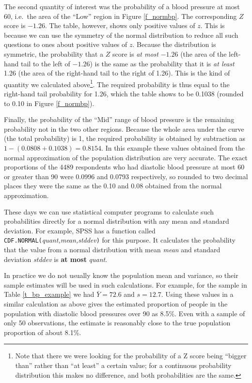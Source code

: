 The second quantity of interest was the probability of a blood pressure
at most 60, i.e.\ the area of the ``Low'' region in Figure
\ref{f_normbp}. The corresponding $Z$ score is $-1.26$. The table,
however, shows only positive values of $z$. This is because we
can use the symmetry of the normal distribution to reduce all such
questions to ones about positive values of $z$. Because the
distribution is symmetric, the probability that a $Z$ score is \emph{at
most} $-1.26$ (the area of the left-hand tail to the left of $-1.26$)
is the same as the probability that it is \emph{at least} 1.26 (the area
of the right-hand tail to the right of 1.26).
This is the kind of quantity we calculated above\footnote{Note that there we were looking for the
probability of a Z score being ``bigger than'' rather than ``at least''
a certain value; for a continuous probability distribution this makes no
difference, and both probabilities are the same.}. The required
probability is thus equal to the right-hand tail probability for 1.26, which
the table shows to be 0.1038
(rounded to 0.10 in Figure
\ref{f_normbp}).

Finally, the probability of the ``Mid'' range of blood pressure is the
remaining probability not in the two other regions. Because the whole
area under the curve (the total probability) is 1, the required
probability is obtained by subtraction as $1-(0.0808+0.1038)=0.8154$. In this example these values
obtained from the normal approximation of the population distribution
are very accurate. The exact proportions of the 4489 respondents who had
diastolic blood pressure at most 60 or greater than 90 were 0.0996 and
0.0793 respectively, so rounded to two decimal places they were the same
as the 0.10 and 0.08 obtained from the normal approximation.

\label{p_cdfnorm}
These days we can use statistical computer programs
to calculate such
probabilities directly for a normal distribution with any mean and
standard deviation. For example, SPSS has a function called
\texttt{CDF.NORMAL(}\emph{quant,mean,stddev}\texttt{)} for this purpose.
It calculates the probability that the value from a normal distribution
with mean \emph{mean} and standard deviation \emph{stddev} is \textbf{at most}
\emph{quant}.

In practice we do not usually know the population mean and variance, so
their sample estimates will be used in such calculations. For example,
for the sample in Table \ref{t_bp_example} we had $\bar{Y}=72.6$ and
$s=12.7$. Using these values in a similar calculation as above gives the
estimated proportion of people in the population with diastolic blood
pressures over 90 as 8.5\%. Even with a sample of only 50 observations,
the estimate is reasonably close to the true population proportion of
about 8.1\%.

